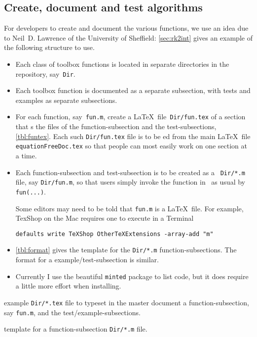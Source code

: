\subsection{Create, document and test algorithms}

For developers to create and document the various functions, we use an idea due to Neil~D. Lawrence of the University of Sheffield:
\autoref{sec:rk2int} gives an example of the following structure to use.

\begin{itemize}
\item Each class of toolbox functions is located in separate directories in the repository, say~\verb|Dir|.

\item Each toolbox function is documented as a separate subsection, with tests and examples as separate subsections.

\item For each function, say~\verb|fun.m|, create a \LaTeX\ file~\verb|Dir/fun.tex| of a section that \verb||s the  files of the function-subsection and the test-subsections, \autoref{tbl:funtex}.
Each such \verb|Dir/fun.tex| file is to be \verb||ed from the main \LaTeX\ file \verb|equationFreeDoc.tex| so that people can most easily work on one section at a time.  

\item Each function-subsection and test-subsection is to be created as a \script\ \verb|Dir/*.m| file, say \verb|Dir/fun.m|, so that users simply invoke the function in \script\ as usual by \verb|fun(...)|.

Some editors may need to be told that \verb|fun.m| is a \LaTeX\ file.  For example, TexShop on the Mac requires one to execute in a Terminal
\begin{verbatim}
defaults write TeXShop OtherTeXExtensions -array-add "m"
\end{verbatim}

\item \autoref{tbl:format} gives the template for the \verb|Dir/*.m| function-subsections.
The format for a example\slash test-subsection is similar.

\item Currently I use the beautiful \verb|minted| package to list code, but it does require a little more effort when installing.

\end{itemize}

\begin{table}
\caption{\label{tbl:funtex}example \texttt{Dir/*.tex} file to typeset in the master document a function-subsection, say \texttt{fun.m}, and the test\slash example-subsections.}

\caption{\label{tbl:format}template for a function-subsection \texttt{Dir/*.m} file.}

\end{table}


